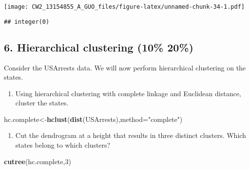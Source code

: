 \documentclass[]{article}
\newenvironment{Shaded}{\begin{snugshade}}{\end{snugshade}}
\newcommand{\KeywordTok}[1]{\textcolor[rgb]{0.13,0.29,0.53}{\textbf{#1}}}
\newcommand{\DataTypeTok}[1]{\textcolor[rgb]{0.13,0.29,0.53}{#1}}
\newcommand{\DecValTok}[1]{\textcolor[rgb]{0.00,0.00,0.81}{#1}}
\newcommand{\StringTok}[1]{\textcolor[rgb]{0.31,0.60,0.02}{#1}}
\newcommand{\NormalTok}[1]{#1}
\providecommand{\tightlist}{%
  \setlength{\itemsep}{0pt}\setlength{\parskip}{0pt}}
\begin{document}
\texttt{[image: CW2\_13154855\_A\_GUO\_files/figure-latex/unnamed-chunk-34-1.pdf]}

\begin{verbatim}
## integer(0)
\end{verbatim}

\subsection{6. Hierarchical clustering (10\% \textbar{}
20\%)}\label{hierarchical-clustering-10-20}

Consider the USArrests data. We will now perform hierarchical clustering
on the states.

\begin{enumerate}
\def\labelenumi{(\alph{enumi})}
\tightlist
\item
  Using hierarchical clustering with complete linkage and Euclidean
  distance, cluster the states.
\end{enumerate}

\begin{Shaded}
\begin{Highlighting}[]
\NormalTok{hc.complete<-}\KeywordTok{hclust}\NormalTok{(}\KeywordTok{dist}\NormalTok{(USArrests),}\DataTypeTok{method=}\StringTok{"complete"}\NormalTok{)}
\end{Highlighting}
\end{Shaded}

\begin{enumerate}
\def\labelenumi{(\alph{enumi})}
\setcounter{enumi}{1}
\tightlist
\item
  Cut the dendrogram at a height that results in three distinct
  clusters. Which states belong to which clusters?
\end{enumerate}

\begin{Shaded}
\begin{Highlighting}[]
\KeywordTok{cutree}\NormalTok{(hc.complete,}\DecValTok{3}\NormalTok{)}
\end{Highlighting}
\end{Shaded}
\end{document}
